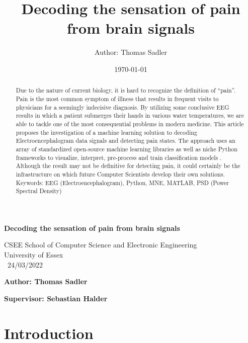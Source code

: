 \documentclass[12pt]{article}
\title{Decoding the sensation of pain from brain signals}
\author{Author: Thomas Sadler}
\date{\today}
\begin{document}
\begin{titlepage}
   \begin{center}
       \vspace*{3cm}
       \Huge
       \textbf{Decoding the sensation of pain from brain signals}
            
                   
       \vspace{1.5cm}
       \Large
       CSEE School of Computer Science and Electronic Engineering \\
       University of Essex\\
       \  24/03/2022

       \vspace{1.5cm}
       \Large
       \textbf{Author: Thomas Sadler}

       \vspace{0.5cm}
       \Large
       \textbf{Supervisor: Sebastian Halder}
            
   \end{center}

\vfill
\begin{abstract}
Due to the nature of current biology, it is hard to recognize the definition of “pain”. Pain is the most common symptom of illness that results in frequent visits to physicians for a seemingly indecisive diagnosis. By utilizing some conclusive EEG results in which a patient submerges their hands in various water temperatures, we are able to tackle one of the most consequential problems in modern medicine. This article proposes the investigation of a machine learning solution to decoding Electroencephalogram data signals and detecting pain states. The approach uses an array of standardized open-source machine learning libraries as well as niche Python frameworks to visualize, interpret, pre-process and train classification models . Although the result may not be definitive for detecting pain, it could certainly be the infrastructure on which future Computer Scientists develop their own solutions.
\newline
\newline
Keywords: EEG (Electroencephalogram), Python, MNE, MATLAB, PSD (Power Spectral Density)
\end{abstract}

\end{titlepage}
\clearpage


\tableofcontents

\clearpage


\section{Introduction}
\end{document}
